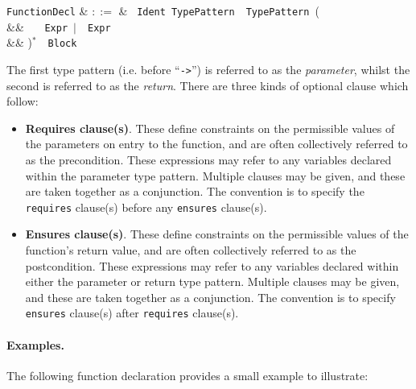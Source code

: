 \begin{syntax}
  \verb+FunctionDecl+ & $::=$ & \ \verb+Ident+\
  \verb+TypePattern+\ \token{->}\ \verb+TypePattern+\ \big(\\
  && \ \ \ \verb+Expr+\ $|$\ \ \verb+Expr+\\
  && \big)$^*$\ \token{:}\ \verb+Block+\\
\end{syntax}

The first type pattern (i.e. before ``\lstinline{->}'') is referred to as the {\em parameter}, whilst the second is referred to as the {\em return}.  There are three kinds of optional clause which follow:

\begin{itemize}

\item {\bf Requires clause(s)}. These define constraints on the permissible values of the parameters on entry to the function, and are often collectively referred to as the \gls{precondition}. These expressions may refer to any variables declared within the parameter type pattern. Multiple clauses may be given, and these are taken together as a conjunction.  The convention is to specify the \lstinline{requires} clause(s) before any \lstinline{ensures} clause(s).

\item {\bf Ensures clause(s)}. These define constraints on the permissible values of the function's return value, and are often collectively referred to as the \gls{postcondition}. These expressions may refer to any variables declared within either the parameter or return type pattern.  Multiple clauses may be given, and these are taken together as a conjunction.  The convention is to specify \lstinline{ensures} clause(s) after \lstinline{requires} clause(s).
\end{itemize}

\paragraph{Examples.}
The following function declaration provides a small example to illustrate:



